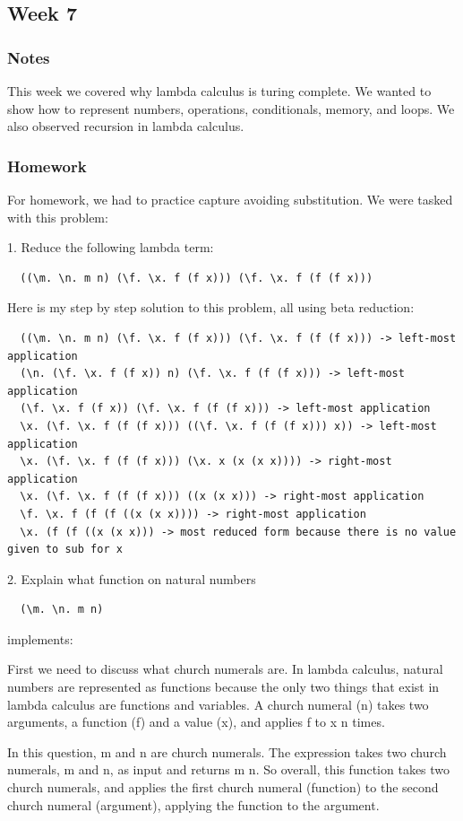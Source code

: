 \documentclass{article}
\theoremstyle{theorem}
\theoremstyle{definition}
\theoremstyle{remark}
\begin{document}
\subsection{Week 7}
\subsubsection*{Notes}
This week we covered why lambda calculus is turing complete. We wanted to show how to represent
numbers, operations, conditionals, memory, and loops. We also observed recursion in lambda calculus.

\subsubsection*{Homework}
For homework, we had to practice capture avoiding substitution. We were tasked with this problem:

1. Reduce the following lambda term:
\begin{lstlisting}
  ((\m. \n. m n) (\f. \x. f (f x))) (\f. \x. f (f (f x))) 
\end{lstlisting}
Here is my step by step solution to this problem, all using beta reduction:
\begin{lstlisting}
  ((\m. \n. m n) (\f. \x. f (f x))) (\f. \x. f (f (f x))) -> left-most application
  (\n. (\f. \x. f (f x)) n) (\f. \x. f (f (f x))) -> left-most application
  (\f. \x. f (f x)) (\f. \x. f (f (f x))) -> left-most application
  \x. (\f. \x. f (f (f x))) ((\f. \x. f (f (f x))) x)) -> left-most application
  \x. (\f. \x. f (f (f x))) (\x. x (x (x x)))) -> right-most application
  \x. (\f. \x. f (f (f x))) ((x (x x))) -> right-most application
  \f. \x. f (f (f ((x (x x)))) -> right-most application
  \x. (f (f ((x (x x))) -> most reduced form because there is no value given to sub for x
\end{lstlisting}
2. Explain what function on natural numbers
\begin{lstlisting}
  (\m. \n. m n)
\end{lstlisting}
implements:

First we need to discuss what church numerals are. In lambda calculus, 
natural numbers are represented as functions because the only two things
that exist in lambda calculus are functions and variables. A church numeral (n)
takes two arguments, a function (f) and a value (x), and applies f to x n times.

In this question, m and n are church numerals. The expression takes two church 
numerals, m and n, as input and returns m n. So overall, this function takes two church
numerals, and applies the first church numeral (function) to the second church numeral
(argument), applying the function to the argument.
\end{document}
